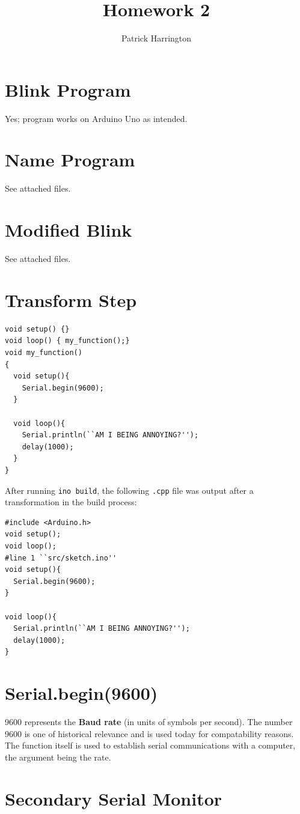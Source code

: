 \documentclass{hw}
\title{Homework 2}
\author{Patrick Harrington}
\begin{document}
\maketitle
\section{Blink Program}
  Yes; program works on Arduino Uno as intended.
\section{Name Program}
  See attached files.
\section{Modified Blink}
  See attached files.
\section{Transform Step}
\begin{lstlisting}
void setup() {}
void loop() { my_function();}
void my_function()
{
  void setup(){
    Serial.begin(9600);
  }

  void loop(){
    Serial.println(``AM I BEING ANNOYING?'');
    delay(1000);
  }
}
\end{lstlisting}

After running \texttt{ino build}, the following \texttt{.cpp} file was output
after a transformation in the build process:

\begin{lstlisting}
#include <Arduino.h>
void setup();
void loop();
#line 1 ``src/sketch.ino''
void setup(){
  Serial.begin(9600);
}
  
void loop(){
  Serial.println(``AM I BEING ANNOYING?'');
  delay(1000);
}
\end{lstlisting}
\section{Serial.begin(9600)}

9600 represents the \textbf{Baud rate} (in units of symbols per second). The
number 9600 is one of historical relevance and is used today for compatability
reasons. The function itself is used to establish serial communications with a
computer, the argument being the rate.

\section{Secondary Serial Monitor}
\end{document}
